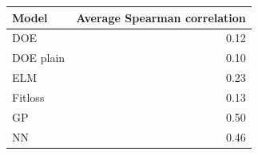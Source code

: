 \begin{tabular}{lr}
\toprule
Model & Average Spearman correlation \\
\midrule
DOE & 0.12 \\
DOE plain & 0.10 \\
ELM & 0.23 \\
Fitloss & 0.13 \\
GP & 0.50 \\
NN & 0.46 \\
\bottomrule
\end{tabular}
